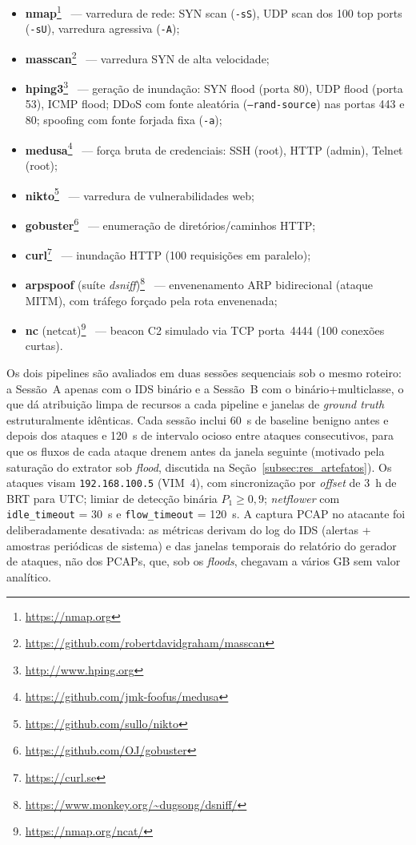 \documentclass[12pt]{article}
\begin{document}
\begin{itemize}
  \item \textbf{nmap}\footnote{\url{https://nmap.org}}~\cite{nmap} — varredura de
    rede: SYN scan (\texttt{-sS}), UDP scan dos 100 top ports (\texttt{-sU}),
    varredura agressiva (\texttt{-A});
  \item \textbf{masscan}\footnote{\url{https://github.com/robertdavidgraham/masscan}}~\cite{masscan}
    — varredura SYN de alta velocidade;
  \item \textbf{hping3}\footnote{\url{http://www.hping.org}}~\cite{hping3} —
    geração de inundação: SYN flood (porta 80), UDP flood (porta 53), ICMP flood;
    DDoS com fonte aleatória (\texttt{--rand-source}) nas portas 443 e 80;
    spoofing com fonte forjada fixa (\texttt{-a});
  \item \textbf{medusa}\footnote{\url{https://github.com/jmk-foofus/medusa}}~\cite{medusa}
    — força bruta de credenciais: SSH (root), HTTP (admin), Telnet (root);
  \item \textbf{nikto}\footnote{\url{https://github.com/sullo/nikto}}~\cite{nikto}
    — varredura de vulnerabilidades web;
  \item \textbf{gobuster}\footnote{\url{https://github.com/OJ/gobuster}}~\cite{gobuster}
    — enumeração de diretórios/caminhos HTTP;
  \item \textbf{curl}\footnote{\url{https://curl.se}}~\cite{curl} — inundação HTTP
    (100 requisições em paralelo);
  \item \textbf{arpspoof} (suíte \textit{dsniff})\footnote{\url{https://www.monkey.org/~dugsong/dsniff/}}~\cite{dsniff}
    — envenenamento ARP bidirecional (ataque MITM), com tráfego forçado pela rota
    envenenada;
  \item \textbf{nc} (netcat)\footnote{\url{https://nmap.org/ncat/}}~\cite{ncat} —
    beacon C2 simulado via TCP porta~4444 (100 conexões curtas).
\end{itemize}

Os dois pipelines são avaliados em duas sessões
sequenciais sob o mesmo roteiro: a Sessão~A apenas com o IDS binário e a Sessão~B
com o binário+multiclasse, o que dá atribuição limpa de recursos a cada pipeline
e janelas de \textit{ground truth} estruturalmente idênticas. Cada sessão inclui
60~s de baseline benigno antes e depois dos ataques e 120~s de intervalo
ocioso entre ataques consecutivos, para que os fluxos de cada ataque drenem
antes da janela seguinte (motivado pela saturação do extrator sob \textit{flood},
discutida na Seção~\ref{subsec:res_artefatos}). Os ataques visam \texttt{192.168.100.5}
(VIM~4), com sincronização por \textit{offset} de 3~h de BRT para UTC; limiar
de detecção binária $P_1 \geq 0{,}9$; \textit{netflower} com \texttt{idle\_timeout}
= 30~s e \texttt{flow\_timeout} = 120~s. A captura PCAP no atacante foi
deliberadamente desativada: as métricas derivam do log do IDS (alertas + amostras
periódicas de sistema) e das janelas temporais do relatório do gerador de ataques, não
dos PCAPs, que, sob os \textit{floods}, chegavam a vários GB sem valor analítico.
\end{document}
